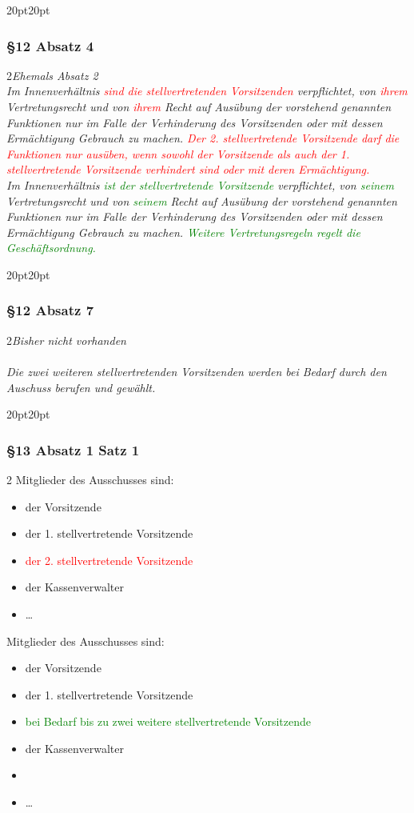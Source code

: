 \documentclass[10pt,a4paper,parskip=half]{scrartcl}
\newcommand{\new}[1]{\textcolor{Green}{#1}}
\newcommand{\old}[1]{\textcolor{Red}{#1}}
\newcommand{\change}[1]{
  \begin{adjustwidth}{20pt}{20pt}
    #1
  \end{adjustwidth}
}
\newcommand{\compare}[3]{\change{\subsubsection*{#1}\begin{multicols}{2}#2\columnbreak\\#3\end{multicols}}}
\begin{document}
  \compare{§12 Absatz 4}
  {\em Ehemals Absatz 2\em\\
  Im Innenverhältnis \old{sind die stellvertretenden Vorsitzenden} verpflichtet,
    von \old{ihrem} Vertretungsrecht und von \old{ihrem} Recht auf Ausübung der vorstehend genannten Funktionen nur im Falle der Verhinderung des Vorsitzenden oder mit dessen Ermächtigung Gebrauch zu machen.
    \old{Der 2. stellvertretende Vorsitzende darf die Funktionen nur ausüben,
    wenn sowohl der
    Vorsitzende als auch der 1. stellvertretende Vorsitzende verhindert sind oder mit deren Ermächtigung.}
  }
  {Im Innenverhältnis \new{ist der stellvertretende Vorsitzende} verpflichtet,
    von \new{seinem} Vertretungsrecht und von \new{seinem} Recht auf Ausübung der vorstehend genannten Funktionen nur im Falle der Verhinderung des Vorsitzenden oder mit dessen Ermächtigung Gebrauch zu machen. \new{Weitere Vertretungsregeln regelt die Geschäftsordnung.}}

  \compare{§12 Absatz 7}
  {\em Bisher nicht vorhanden\em\\}{
    Die zwei weiteren stellvertretenden Vorsitzenden werden bei Bedarf durch den Auschuss berufen und gewählt.
  }


  \clearpage
  \change{
    \subsubsection*{§13 Absatz 1 Satz 1}
    \begin{multicols}{2}
    Mitglieder des Ausschusses sind:
      \begin{itemize}[noitemsep]
        \item der Vorsitzende
        \item der 1. stellvertretende Vorsitzende
        \item \old{der 2. stellvertretende Vorsitzende}
        \item der Kassenverwalter
        \item \dots
      \end{itemize}
    \columnbreak
    Mitglieder des Ausschusses sind:
      \begin{itemize}[noitemsep]
        \item der Vorsitzende
        \item der 1. stellvertretende Vorsitzende
        \item \new{bei Bedarf bis zu zwei weitere stellvertretende Vorsitzende}
        \item der Kassenverwalter
        \item \item \dots
      \end{itemize}
    \end{multicols}
    }
\end{document}
